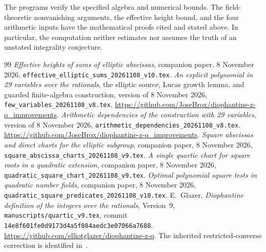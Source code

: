 \documentclass[11pt,a4paper]{article}
\begin{document}
The programs verify the specified algebra and numerical bounds.
The field-theoretic nonvanishing arguments, the effective height
bound, and the four arithmetic inputs have the mathematical
proofs cited and stated above. In particular, the computation
neither estimates nor assumes the truth of an unstated
integrality conjecture.

\begin{thebibliography}{99}
\emph{Effective heights of sums of elliptic abscissas},
companion paper, 8 November 2026,
\nolinkurl{effective_elliptic_sums_20261108_v10.tex}.
\emph{An explicit polynomial in 29 variables over the rationals},
the elliptic source, Lucas growth lemma, and guarded finite-algebra
construction, version of 8 November 2026,
\nolinkurl{few_variables_20261108_v8.tex}.
\url{https://github.com/JoseBrox/diophantine-z-q_improvements}.
\emph{Arithmetic dependencies of the construction with 29 variables},
version of 8 November 2026,
\nolinkurl{arithmetic_dependencies_20261108_v8.tex}.
\url{https://github.com/JoseBrox/diophantine-z-q_improvements}.
\emph{Square abscissas and direct charts for the elliptic subgroup},
companion paper, 8 November 2026,
\nolinkurl{square_abscissa_charts_20261108_v9.tex}.
\emph{A single quartic chart for square roots in a quadratic extension},
companion paper, 8 November 2026,
\nolinkurl{quadratic_square_chart_20261108_v9.tex}.
\emph{Optimal polynomial square tests in quadratic number fields},
companion paper, 8 November 2026,
\nolinkurl{quadratic_square_predicates_20261108_v10.tex}.
E.~Glazer, \emph{Diophantine definition of the integers over the
rationals}, Version~9, \nolinkurl{manuscripts/quartic_v9.tex},
commit \nolinkurl{14e8f601fe0d9173d4a5f084aedc3e07066a7688}.
\url{https://github.com/elliotglazer/diophantine-z-q}.
The inherited restricted-converse correction is identified
in~\cite{Dependencies}.
\end{thebibliography}
\end{document}
